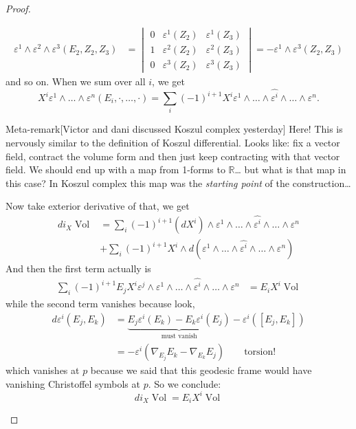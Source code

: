 \begin{proof}
\begin{enumerate}[label=\textbf{Step \arabic*}]
\begin{align*}
	\varepsilon^1\wedge\varepsilon^2\wedge\varepsilon^3(E_2,Z_2,Z_3)&=\begin{vmatrix} 0&\varepsilon^1(Z_2) &\varepsilon^1(Z_3)\\
1&\varepsilon^2(Z_2)&\varepsilon^2(Z_3)\\
0&\varepsilon^3(Z_2)&\varepsilon^3(Z_3)
	\end{vmatrix}=-\varepsilon^1\wedge\varepsilon^3(Z_2,Z_3)
	\end{align*}
and so on. When we sum over all \(i\), we get
\[X^i\varepsilon^1\wedge\ldots\wedge\varepsilon^n(E_i,\cdot,\ldots,\cdot)=\sum_{i}(-1)^{i+1}X^i\varepsilon^1\wedge\ldots\wedge\widehat{\varepsilon^i}\wedge\ldots\wedge\varepsilon^n.\]
\begin{thing7}{Meta-remark}[Victor and dani discussed Koszul complex yesterday]\leavevmode
	Here! This is nervously similar to the definition of Koszul differential. Looks like: fix a vector field, contract the volume form and then just keep contracting with that vector field. We should end up with a map from 1-forms to \(\mathbb{R}\)… but what is that map in this case? In Koszul complex this map was the \textit{starting point} of the construction…
\end{thing7}

Now take exterior derivative of that, we get
\begin{align*}
d i_X\operatorname{Vol}&=\sum_i(-1)^{i+1}(dX^i)\wedge\varepsilon^1\wedge\ldots\wedge\widehat{\varepsilon^i}\wedge\ldots\wedge\varepsilon^n\\
&+\sum_{i}(-1)^{i+1}X^i\wedge d(\varepsilon^1\wedge\ldots\wedge\widehat{\varepsilon^i}\wedge\ldots\wedge\varepsilon^n)\end{align*}
And then the first term actually is
\begin{align*}
\sum_i(-1)^{i+1}E_jX^i\varepsilon^j\wedge\varepsilon^1\wedge\ldots\wedge\widehat{\varepsilon^i}\wedge\ldots\wedge\varepsilon^n&=E_iX^i\operatorname{Vol}
\end{align*}
while the second term vanishes because look,
\begin{align*}d \varepsilon^i(E_j,E_k)&=\underbrace{E_j\varepsilon^i(E_k)-E_k\varepsilon^i(E_j)}_{\text{must vanish}}-\varepsilon^i([E_j,E_k])\\
&=-\varepsilon^i(\nabla_{E_j}E_k-\nabla_{E_k}E_j)\qquad \text{torsion!} \end{align*}
which vanishes at \(p\) because we said that this geodesic frame would have vanishing Christoffel symbols at \(p\). So we conclude:
\[di_X \operatorname{Vol}=E_iX^i\operatorname{Vol}\]


\end{enumerate}
\end{proof}
